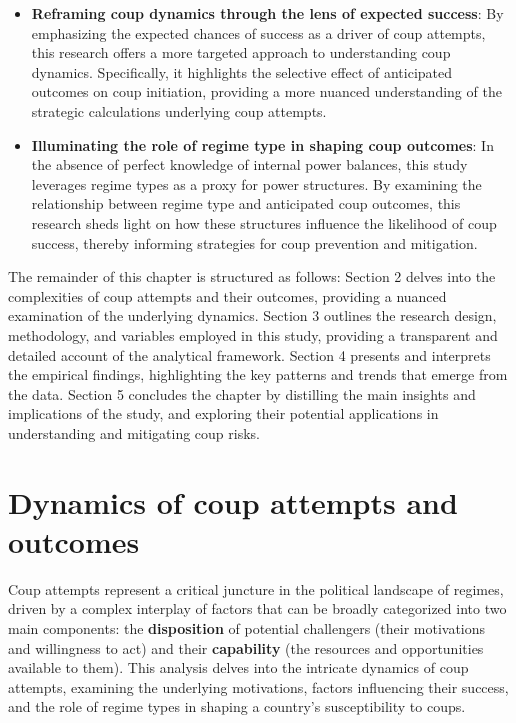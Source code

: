 \documentclass[
  12pt,
]{report}
\begin{document}
\begin{itemize}
\item
  \textbf{Reframing coup dynamics through the lens of expected success}:
  By emphasizing the expected chances of success as a driver of coup
  attempts, this research offers a more targeted approach to
  understanding coup dynamics. Specifically, it highlights the selective
  effect of anticipated outcomes on coup initiation, providing a more
  nuanced understanding of the strategic calculations underlying coup
  attempts.
\item
  \textbf{Illuminating the role of regime type in shaping coup
  outcomes}: In the absence of perfect knowledge of internal power
  balances, this study leverages regime types as a proxy for power
  structures. By examining the relationship between regime type and
  anticipated coup outcomes, this research sheds light on how these
  structures influence the likelihood of coup success, thereby informing
  strategies for coup prevention and mitigation.
\end{itemize}

The remainder of this chapter is structured as follows: Section 2 delves
into the complexities of coup attempts and their outcomes, providing a
nuanced examination of the underlying dynamics. Section 3 outlines the
research design, methodology, and variables employed in this study,
providing a transparent and detailed account of the analytical
framework. Section 4 presents and interprets the empirical findings,
highlighting the key patterns and trends that emerge from the data.
Section 5 concludes the chapter by distilling the main insights and
implications of the study, and exploring their potential applications in
understanding and mitigating coup risks.

\section{Dynamics of coup attempts and
outcomes}\label{dynamics-of-coup-attempts-and-outcomes}

Coup attempts represent a critical juncture in the political landscape
of regimes, driven by a complex interplay of factors that can be broadly
categorized into two main components: the \textbf{disposition} of
potential challengers (their motivations and willingness to act) and
their \textbf{capability} (the resources and opportunities available to
them). This analysis delves into the intricate dynamics of coup
attempts, examining the underlying motivations, factors influencing
their success, and the role of regime types in shaping a country's
susceptibility to coups.
\end{document}
